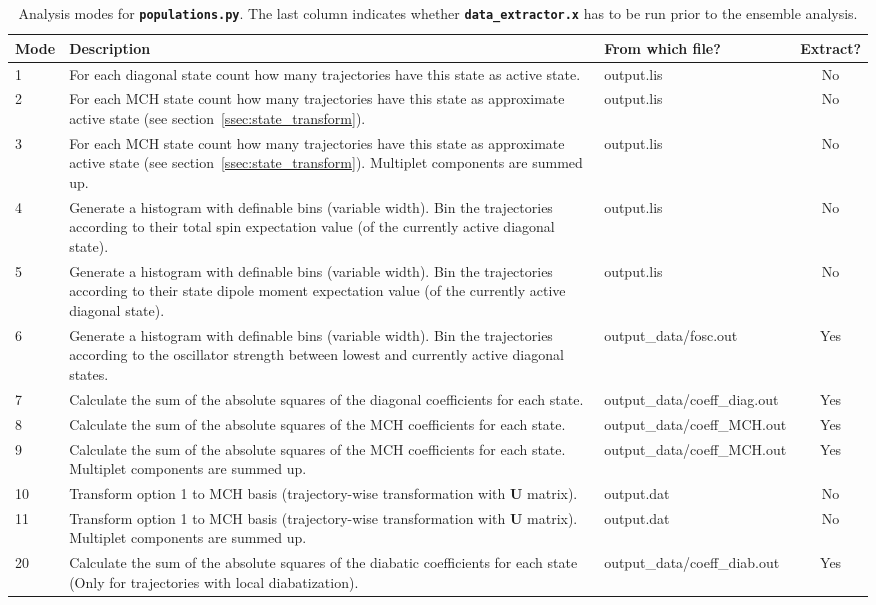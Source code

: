 \documentclass[a4paper,10pt,DIV=15,openany]{scrbook}
\newcommand{\ttt}[1]{\textbf{\texttt{#1}}}
\newcommand{\VEC}[1]{\ensuremath{\mathbf{#1}}}
\begin{document}
\begin{table}
  \centering
  \caption[Analysis modes for \ttt{populations.py}.]{Analysis modes for \ttt{populations.py}. The last column indicates whether \ttt{data\_extractor.x} has to be run prior to the ensemble analysis.}
  \label{tab:Populations_modes}
  \begin{tabular}{lp{8.5cm}>{\ttfamily}lc}
    \hline
    Mode        &Description    &\rmfamily From which file?     &Extract?\\
    \hline
    1   &For each diagonal state count how many trajectories have this state as active state. &output.lis  &No\\
    2   &For each MCH state count how many trajectories have this state as approximate active state (see section~\ref{ssec:state_transform}). &output.lis  &No\\
    3   &For each MCH state count how many trajectories have this state as approximate active state (see section~\ref{ssec:state_transform}). Multiplet components are summed up. &output.lis  &No\\
    4   &Generate a histogram with definable bins (variable width). Bin the trajectories according to their total spin expectation value (of the currently active diagonal state).   &output.lis &No\\
    5   &Generate a histogram with definable bins (variable width). Bin the trajectories according to their state dipole moment expectation value (of the currently active diagonal state).   &output.lis &No\\
    6   &Generate a histogram with definable bins (variable width). Bin the trajectories according to the oscillator strength between lowest and currently active diagonal states.        &output\_data/fosc.out  &Yes\\
    7   &Calculate the sum of the absolute squares of the diagonal coefficients for each state.       &output\_data/coeff\_diag.out&Yes\\
    8   &Calculate the sum of the absolute squares of the MCH coefficients for each state.       &output\_data/coeff\_MCH.out&Yes\\
    9   &Calculate the sum of the absolute squares of the MCH coefficients for each state. Multiplet components are summed up.       &output\_data/coeff\_MCH.out&Yes\\
   10   &Transform option 1 to MCH basis (trajectory-wise transformation with $\VEC{U}$ matrix).   &output.dat&No\\
   11   &Transform option 1 to MCH basis (trajectory-wise transformation with $\VEC{U}$ matrix). Multiplet components are summed up.   &output.dat&No\\
   20   &Calculate the sum of the absolute squares of the diabatic coefficients for each state (Only for trajectories with local diabatization).      &output\_data/coeff\_diab.out&Yes\\
    \hline
  \end{tabular}
\end{table}
\end{document}
